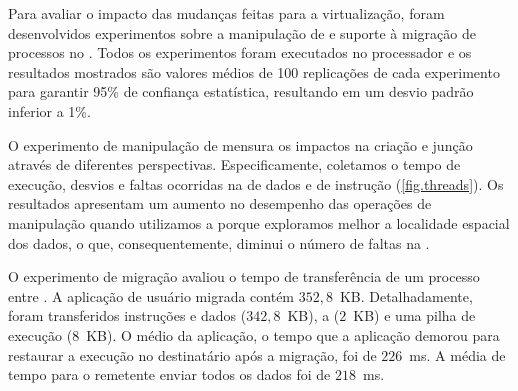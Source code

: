 Para avaliar o impacto das mudanças feitas para a virtualização, foram desenvolvidos experimentos sobre a manipulação de \threads e suporte à migração de processos no \nanvix. Todos os experimentos foram executados no processador \mppa e os resultados mostrados são valores médios de 100 replicações de cada experimento para garantir 95\% de confiança estatística, resultando em um desvio padrão inferior a 1\%.

O experimento de manipulação de \threads mensura os impactos na criação e junção através de diferentes perspectivas. Especificamente, coletamos o tempo de execução, desvios e faltas ocorridas na \cache de dados e de instrução (\autoref{fig.threads}).
Os resultados apresentam um aumento no desempenho das operações de manipulação quando utilizamos a \uarea porque exploramos melhor a localidade espacial dos dados, o que, consequentemente, diminui o número de faltas na \cache.

O experimento de migração avaliou o tempo de transferência de um processo entre \clusters.
A aplicação de usuário migrada contém $352,8$~KB. Detalhadamente, foram transferidos instruções e dados ($342,8$~KB), a \uarea ($2$~KB) e uma pilha de execução ($8$~KB). O \downtime médio da aplicação, \ie o tempo que a aplicação demorou para restaurar a execução no \cluster destinatário após a migração, foi de $226$~ms. A média de tempo para o \cluster remetente enviar todos os dados foi de $218$~ms.